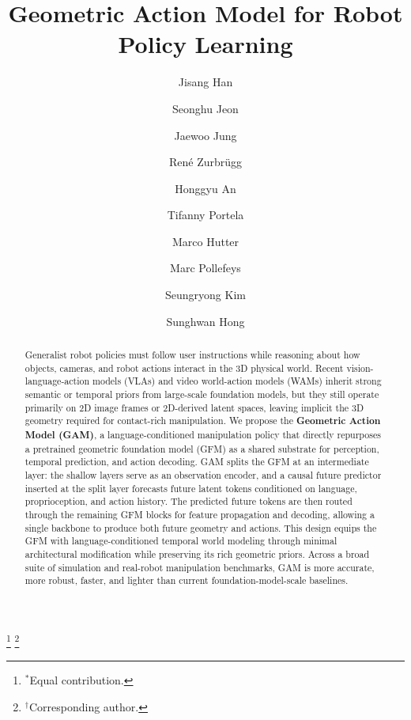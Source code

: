 \documentclass{llmxive}
\title{Geometric Action Model for Robot Policy Learning}
\author{Jisang Han \and Seonghu Jeon \and Jaewoo Jung \and René Zurbrügg \and Honggyu An \and Tifanny Portela \and Marco Hutter \and Marc Pollefeys \and Seungryong Kim \and Sunghwan Hong}
\providecommand{\blfootnote}[1]{\footnote{#1}}
\begin{document}
\maketitle
\begin{abstract}
Generalist robot policies must follow user instructions while reasoning about how objects, cameras, and robot actions interact in the 3D physical world. Recent vision-language-action models (VLAs) and video world-action models (WAMs) inherit strong semantic or temporal priors from large-scale foundation models, but they still operate primarily on 2D image frames or 2D-derived latent spaces, leaving implicit the 3D geometry required for contact-rich manipulation. We propose the \textbf{Geometric Action Model (GAM)}, a language-conditioned manipulation policy that directly repurposes a pretrained geometric foundation model (GFM) as a shared substrate for perception, temporal prediction, and action decoding. GAM splits the GFM at an intermediate layer: the shallow layers serve as an observation encoder, and a causal future predictor inserted at the split layer forecasts future latent tokens conditioned on language, proprioception, and action history. The predicted future tokens are then routed through the remaining GFM blocks for feature propagation and decoding, allowing a single backbone to produce both future geometry and actions. This design equips the GFM with language-conditioned temporal world modeling through minimal architectural modification while preserving its rich geometric priors. Across a broad suite of simulation and real-robot manipulation benchmarks, GAM is more accurate, more robust, faster, and lighter than current foundation-model-scale baselines.
\end{abstract}
\blfootnote{$^*$Equal contribution.}
\blfootnote{$^\dagger$Corresponding author.}





\end{document}
